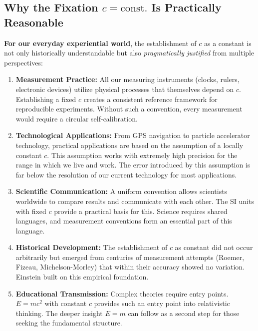 	\subsection{Why the Fixation \( c = \text{const.} \) Is Practically Reasonable}
	
	\textbf{For our everyday experiential world}, the establishment of \( c \) as a constant is not only historically understandable but also \textit{pragmatically justified} from multiple perspectives:
	
	\begin{enumerate}[leftmargin=*, label=\textbf{\arabic*.}]
		\item \textbf{Measurement Practice:} All our measuring instruments (clocks, rulers, electronic devices) utilize physical processes that themselves depend on \( c \). Establishing a fixed \( c \) creates a consistent reference framework for reproducible experiments. Without such a convention, every measurement would require a circular self-calibration.
		
		\item \textbf{Technological Applications:} From GPS navigation to particle accelerator technology, practical applications are based on the assumption of a locally constant \( c \). This assumption works with extremely high precision for the range in which we live and work. The error introduced by this assumption is far below the resolution of our current technology for most applications.
		
		\item \textbf{Scientific Communication:} A uniform convention allows scientists worldwide to compare results and communicate with each other. The SI units with fixed \( c \) provide a practical basis for this. Science requires shared languages, and measurement conventions form an essential part of this language.
		
		\item \textbf{Historical Development:} The establishment of \( c \) as constant did not occur arbitrarily but emerged from centuries of measurement attempts (Roemer, Fizeau, Michelson-Morley) that within their accuracy showed no variation. Einstein built on this empirical foundation.
		
		\item \textbf{Educational Transmission:} Complex theories require entry points. \( E = mc^2 \) with constant \( c \) provides such an entry point into relativistic thinking. The deeper insight \( E = m \) can follow as a second step for those seeking the fundamental structure.
	\end{enumerate}
	
